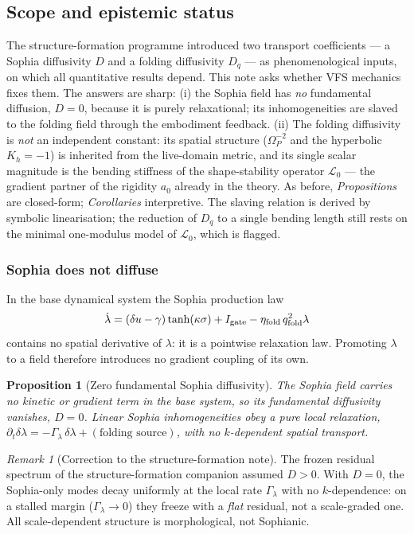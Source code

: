 \documentclass[11pt,a4paper]{article}
\newcommand{\Op}{\Omega_P}
\newcommand{\qf}{q_{\rm fold}}
\newcommand{\Dq}{D_q}
\newcommand{\etaf}{\eta_{\rm fold}}
\newcommand{\Glam}{\Gamma_\lambda}
\newcommand{\Lop}{\mathcal L_0}
\theoremstyle{plain}
\newtheorem{proposition}{Proposition}[section]
\theoremstyle{definition}
\theoremstyle{remark}
\newtheorem{remark}{Remark}[section]
\begin{document}
\subsection*{Scope and epistemic status}
The structure-formation programme introduced two transport coefficients --- a Sophia diffusivity $D$ and a
folding diffusivity $\Dq$ --- as phenomenological inputs, on which all quantitative results depend. This
note asks whether VFS mechanics fixes them. The answers are sharp: (i) the Sophia field has \emph{no}
fundamental diffusion, $D=0$, because it is purely relaxational; its inhomogeneities are slaved to the
folding field through the embodiment feedback. (ii) The folding diffusivity is \emph{not} an independent
constant: its spatial structure ($\Op^{-2}$ and the hyperbolic $K_h=-1$) is inherited from the
live-domain metric, and its single scalar magnitude is the bending stiffness of the shape-stability
operator $\Lop$ --- the gradient partner of the rigidity $a_0$ already in the theory. As before,
\emph{Propositions} are closed-form; \emph{Corollaries} interpretive. The slaving relation is derived by symbolic linearisation; the reduction of $\Dq$ to a single bending length still rests on the minimal one-modulus
model of $\Lop$, which is flagged.

\subsubsection{Sophia does not diffuse}

In the base dynamical system the Sophia production law
\begin{equation}
\dot\lambda=(\delta u-\gamma)\tanh(\kappa\sigma)+I_{\rm gate}-\etaf\,\qf^{2}\lambda
\end{equation}
contains no spatial derivative of $\lambda$: it is a pointwise relaxation law. Promoting $\lambda$ to a
field therefore introduces no gradient coupling of its own.

\begin{proposition}[Zero fundamental Sophia diffusivity]
The Sophia field carries no kinetic or gradient term in the base system, so its fundamental diffusivity
vanishes, $D=0$. Linear Sophia inhomogeneities obey a pure local relaxation,
$\partial_t\delta\lambda=-\Glam\,\delta\lambda+(\text{folding source})$, with no $k$-dependent spatial
transport.
\end{proposition}

\begin{remark}[Correction to the structure-formation note]
The frozen residual spectrum of the structure-formation companion assumed $D>0$. With $D=0$, the
Sophia-only modes decay uniformly at the local rate $\Glam$ with no $k$-dependence: on a stalled margin
($\Glam\to0$) they freeze with a \emph{flat} residual, not a scale-graded one. All scale-dependent
structure is morphological, not Sophianic.
\end{remark}
\end{document}
